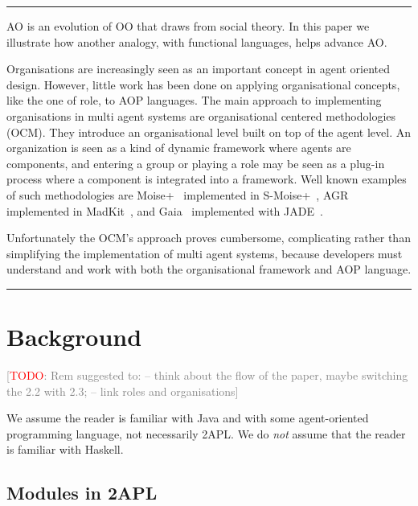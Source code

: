 \documentclass[conference,compsoc]{IEEEtran} %
\newcommand{\todo}[1]{{\small \textcolor{gray}{[\textcolor{red}{TODO}: #1]}}}
\newenvironment{notes}{\medskip\hrule\nobreak\smallskip\narrower}{\smallskip\hrule\medskip}
\begin{document}
\begin{notes}
AO is an evolution of OO that draws from social theory. In this paper we
illustrate how another analogy, with functional languages, helps advance 
AO\null. 

Organisations are increasingly seen as an important concept in agent
oriented design. However, little work has been done on applying
organisational concepts, like the one of role, to AOP languages. The main
approach to implementing organisations in multi agent systems are
organisational centered methodologies (OCM). They introduce an
organisational level built on top of the agent level. An organization is
seen as a kind of dynamic framework where agents are components, and
entering a group or playing a role may be seen as a plug-in process where a
component is integrated into a framework. Well known examples of such
methodologies are Moise+~\cite{DBLP:conf/atal/HubnerSB05} implemented in
S-Moise+~\cite{DBLP:conf/atal/HubnerSB05},
AGR~\cite{DBLP:conf/aose/FerberGM03} implemented in
MadKit~\cite{DBLP:conf/agents/GutknechtF00a}, and
Gaia~\cite{DBLP:journals/tosem/ZambonelliJW03} implemented with
JADE~\cite{DBLP:conf/jit/MoraitisPS02}.

Unfortunately the OCM's approach proves cumbersome, complicating rather
than simplifying the implementation of multi agent systems, because
developers must understand and work with both the organisational framework
and AOP language.

\end{notes}

\section{Background} %

\todo{Rem suggested to: -- think about the flow of the paper, maybe switching the 2.2 with 2.3; -- link roles and organisations}

We assume the reader is familiar with Java and with some agent-oriented
programming language, not necessarily 2APL. We do \emph{not} assume that
the reader is familiar with Haskell.

\subsection{Modules in 2APL} %
\end{document}
